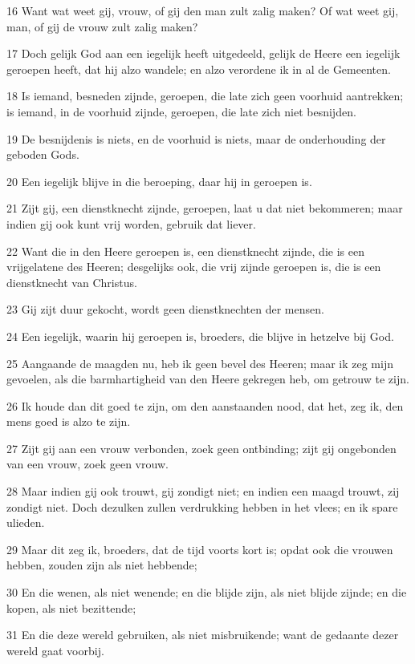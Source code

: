 \par 16 Want wat weet gij, vrouw, of gij den man zult zalig maken? Of wat weet gij, man, of gij de vrouw zult zalig maken?
\par 17 Doch gelijk God aan een iegelijk heeft uitgedeeld, gelijk de Heere een iegelijk geroepen heeft, dat hij alzo wandele; en alzo verordene ik in al de Gemeenten.
\par 18 Is iemand, besneden zijnde, geroepen, die late zich geen voorhuid aantrekken; is iemand, in de voorhuid zijnde, geroepen, die late zich niet besnijden.
\par 19 De besnijdenis is niets, en de voorhuid is niets, maar de onderhouding der geboden Gods.
\par 20 Een iegelijk blijve in die beroeping, daar hij in geroepen is.
\par 21 Zijt gij, een dienstknecht zijnde, geroepen, laat u dat niet bekommeren; maar indien gij ook kunt vrij worden, gebruik dat liever.
\par 22 Want die in den Heere geroepen is, een dienstknecht zijnde, die is een vrijgelatene des Heeren; desgelijks ook, die vrij zijnde geroepen is, die is een dienstknecht van Christus.
\par 23 Gij zijt duur gekocht, wordt geen dienstknechten der mensen.
\par 24 Een iegelijk, waarin hij geroepen is, broeders, die blijve in hetzelve bij God.
\par 25 Aangaande de maagden nu, heb ik geen bevel des Heeren; maar ik zeg mijn gevoelen, als die barmhartigheid van den Heere gekregen heb, om getrouw te zijn.
\par 26 Ik houde dan dit goed te zijn, om den aanstaanden nood, dat het, zeg ik, den mens goed is alzo te zijn.
\par 27 Zijt gij aan een vrouw verbonden, zoek geen ontbinding; zijt gij ongebonden van een vrouw, zoek geen vrouw.
\par 28 Maar indien gij ook trouwt, gij zondigt niet; en indien een maagd trouwt, zij zondigt niet. Doch dezulken zullen verdrukking hebben in het vlees; en ik spare ulieden.
\par 29 Maar dit zeg ik, broeders, dat de tijd voorts kort is; opdat ook die vrouwen hebben, zouden zijn als niet hebbende;
\par 30 En die wenen, als niet wenende; en die blijde zijn, als niet blijde zijnde; en die kopen, als niet bezittende;
\par 31 En die deze wereld gebruiken, als niet misbruikende; want de gedaante dezer wereld gaat voorbij.
